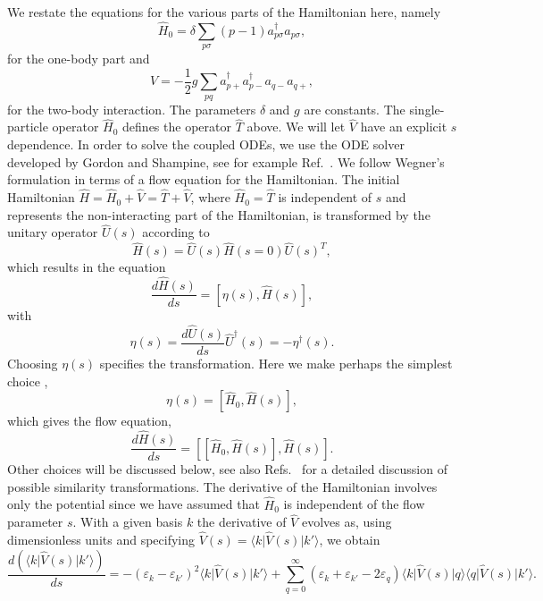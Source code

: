 We restate the equations for the various parts of the Hamiltonian here, namely
 \[
  \hat{H}_0 = \delta \sum_{p \sigma} (p-1) a^{\dagger}_{p \sigma} a_{p\sigma},
  \]
for the one-body part
and 
  \[
  \hat{V} = -\frac{1}{2}g \sum_{pq} a^{\dagger}_{p+}a^{\dagger}_{p-}a_{q-}a_{q+},
  \]
for the two-body interaction. The parameters $\delta$ and $g$ are constants.
The single-particle operator $\hat{H}_0$ defines the operator $\hat{T}$ above. We will let $\hat{V}$ have an explicit $s$ dependence. 
In order to solve the coupled ODEs, we use the ODE solver developed by Gordon and Shampine, see for example Ref.~\cite{Shampine:1975qq}.
We follow Wegner's formulation \cite{Wegner:1994dk} in terms of a flow equation
for the Hamiltonian.
The initial  Hamiltonian $\hat{H} = \hat{H}_0 + \hat{V}=\hat{T}+\hat{V}$, where $\hat{H}_0=\hat{T}$ is independent of $s$ and
represents the non-interacting part of the Hamiltonian, is transformed by the 
unitary operator $\hat{U}(s)$ according to
\[ 
\hat{H}(s) = \hat{U}(s)\hat{H}(s=0)\hat{U}(s)^T, 
\]
which results in the equation
\[
  \frac{d\hat{H}(s)}{ds}= [\eta(s),\hat{H}(s)],
\]
with
\[
   \eta(s) = \frac{d\hat{U}(s)}{ds} \hat{U}^\dagger(s) = -\eta^\dagger(s).
\]
Choosing $\eta(s)$ specifies the transformation.
Here we make perhaps the simplest choice \cite{Wegner:1994dk},
\begin{equation}
  \eta(s) =  [\hat{H}_0, \hat{H}(s)]
  \label{eq:choice},
\end{equation}
which gives the flow equation,
\begin{equation}
  \frac{d\hat{H}(s)}{ds}=  [ [\hat{H}_0, \hat{H}(s)], \hat{H}(s)].
  \label{eq:commutator}
\end{equation}
%
Other choices will be discussed below, see also
Refs.~\cite{Hergert:2016jk,Hergert:2016ng,Morris:2016xp} for a detailed discussion of
possible similarity transformations.  The derivative of the
Hamiltonian involves only the potential since we have assumed that
$\hat{H}_0$ is independent of the flow parameter $s$. With a given
basis $k$ the derivative of $\hat{V}$ evolves as, using dimensionless
units and specifying $\hat{V}(s) = \langle k \vert \hat{V}(s) \vert
k'\rangle$, we obtain
\begin{equation} \frac{d(\langle k \vert \hat{V}(s) \vert k'\rangle)}{ds} =- (\varepsilon_k -\varepsilon_{k'} )^2\langle k \vert \hat{V}(s) \vert k'\rangle
    + \sum_{q=0}^{\infty}(\varepsilon_k + \varepsilon_{k'} - 2\varepsilon_{q})\langle k \vert \hat{V}(s) \vert q\rangle\langle q \vert \hat{V}(s) \vert k'\rangle.
      \label{eq:diffeq}
\end{equation}
